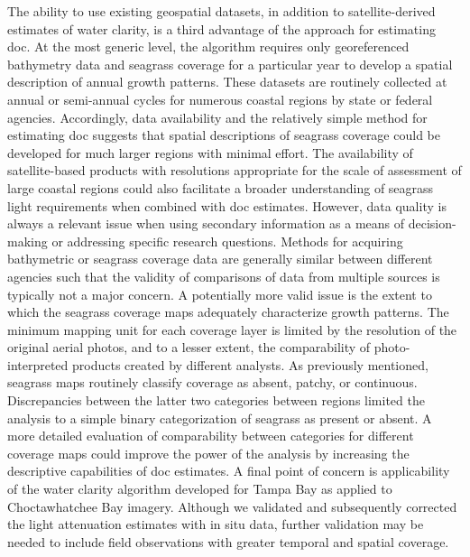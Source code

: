 \documentclass[letterpaper,12pt,oneside]{article}\usepackage[]{graphicx}\usepackage[]{color}
\begin{document}
The ability to use existing geospatial datasets, in addition to satellite-derived estimates of water clarity, is a third advantage of the approach for estimating \ac{doc}.  At the most generic level, the algorithm requires only georeferenced bathymetry data and seagrass coverage for a particular year to develop a spatial description of annual growth patterns.  These datasets are routinely collected at annual or semi-annual cycles for numerous coastal regions by state or federal agencies.  Accordingly, data availability and the relatively simple method for estimating \ac{doc} suggests that spatial descriptions of seagrass coverage could be developed for much larger regions with minimal effort.  The availability of satellite-based products with resolutions appropriate for the scale of assessment of large coastal regions could also facilitate a broader understanding of seagrass light requirements when combined with \ac{doc} estimates.  However, data quality is always a relevant issue when using secondary information as a means of decision-making or addressing specific research questions.  Methods for acquiring bathymetric or seagrass coverage data are generally similar between different agencies such that the validity of comparisons of data from multiple sources is typically not a major concern.  A potentially more valid issue is the extent to which the seagrass coverage maps adequately characterize growth patterns.  The minimum mapping unit for each coverage layer is limited by the resolution of the original aerial photos, and to a lesser extent, the comparability of photo-interpreted products created by different analysts.  As previously mentioned, seagrass maps routinely classify coverage as absent, patchy, or continuous.  Discrepancies between the latter two categories between regions limited the analysis to a simple binary categorization of seagrass as present or absent. A more detailed evaluation of comparability between categories for different coverage maps could improve the power of the analysis by increasing the descriptive capabilities of \ac{doc} estimates.  A final point of concern is applicability of the water clarity algorithm developed for Tampa Bay as applied to Choctawhatchee Bay imagery.  Although we validated and subsequently corrected the light attenuation estimates with in situ data, further validation may be needed to include field observations with greater temporal and spatial coverage. 

\end{document}
